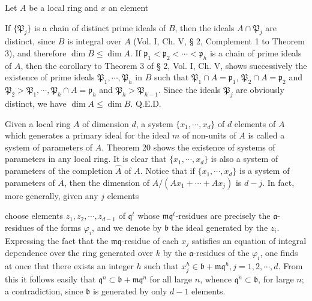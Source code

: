Let $A$ be a local ring and $x$ an element

If $\{\mathfrak{P}_j\}$ is a chain of distinct prime ideals of $B$, then the ideals $A \cap \mathfrak{P}_j$ are distinct, since $B$ is integral over $A$ (Vol. I, Ch. V, § 2, Complement 1 to Theorem 3), and therefore $\dim B \leq \dim A$. If $\mathfrak{p}_1 < \mathfrak{p}_2 < \cdots < \mathfrak{p}_h$ is a chain of prime ideals of $A$, then the corollary to Theorem 3 of § 2, Vol. I, Ch. V, shows successively the existence of prime ideals $\mathfrak{P}_1, \cdots, \mathfrak{P}_h$ in $B$ such that $\mathfrak{P}_1 \cap A = \mathfrak{p}_1$, $\mathfrak{P}_2 \cap A = \mathfrak{p}_2$ and $\mathfrak{P}_2 > \mathfrak{P}_1, \cdots, \mathfrak{P}_h \cap A = \mathfrak{p}_h$ and $\mathfrak{P}_h > \mathfrak{P}_{h-1}$. Since the ideals $\mathfrak{P}_j$ are obviously distinct, we have $\dim A \leq \dim B$. Q.E.D.

Given a local ring $A$ of dimension $d$, a system $\{x_1, \cdots, x_d\}$ of $d$ elements of $A$ which generates a primary ideal for the ideal $m$ of non-units of $A$ is called a system of parameters of $A$. Theorem 20 shows the existence of systems of parameters in any local ring. It is clear that $\{x_1, \cdots, x_d\}$ is also a system of parameters of the completion $\hat{A}$ of $A$. Notice that if $\{x_1, \cdots, x_d\}$ is a system of parameters of $A$, then the dimension of $A/(Ax_1 + \cdots + Ax_j)$ is $d-j$. In fact, more generally, given any $j$ elements

choose elements $z_1, z_2, \cdots, z_{d-1}$ of $\mathfrak{q}^t$ whose $\mathfrak{mq}^t$-residues are precisely the $\mathfrak{a}$-residues of the forms $\varphi_i$, and we denote by $\mathfrak{b}$ the ideal generated by the $z_i$. Expressing the fact that the $\mathfrak{mq}$-residue of each $x_j$ satisfies an equation of integral dependence over the ring generated over $k$ by the $\mathfrak{a}$-residues of the $\varphi_i$, one finds at once that there exists an integer $h$ such that $x_j^h \in \mathfrak{b} + \mathfrak{mq}^h, j=1, 2, \cdots, d$. From this it follows easily that $\mathfrak{q}^n \subset \mathfrak{b} + \mathfrak{mq}^n$ for all large $n$, whence $\mathfrak{q}^n \subset \mathfrak{b}$, for large $n$; a contradiction, since $\mathfrak{b}$ is generated by only $d-1$ elements.